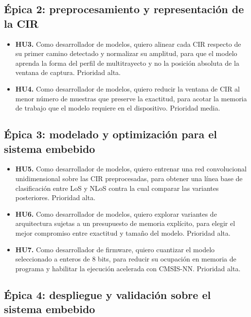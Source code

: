 \documentclass[
11pt, %
]{charter}
\begin{document}
\subsection{Épica 2: preprocesamiento y representación de la CIR}

\begin{itemize}
    \item \textbf{HU3.} Como desarrollador de modelos, quiero alinear cada CIR respecto de su primer camino detectado y normalizar su amplitud, para que el modelo aprenda la forma del perfil de multitrayecto y no la posición absoluta de la ventana de captura. Prioridad alta.
    \item \textbf{HU4.} Como desarrollador de modelos, quiero reducir la ventana de CIR al menor número de muestras que preserve la exactitud, para acotar la memoria de trabajo que el modelo requiere en el dispositivo. Prioridad media.
\end{itemize}

\subsection{Épica 3: modelado y optimización para el sistema embebido}

\begin{itemize}
    \item \textbf{HU5.} Como desarrollador de modelos, quiero entrenar una red convolucional unidimensional sobre las CIR preprocesadas, para obtener una línea base de clasificación entre LoS y NLoS contra la cual comparar las variantes posteriores. Prioridad alta.
    \item \textbf{HU6.} Como desarrollador de modelos, quiero explorar variantes de arquitectura sujetas a un presupuesto de memoria explícito, para elegir el mejor compromiso entre exactitud y tamaño del modelo. Prioridad alta.
    \item \textbf{HU7.} Como desarrollador de firmware, quiero cuantizar el modelo seleccionado a enteros de 8 bits, para reducir su ocupación en memoria de programa y habilitar la ejecución acelerada con CMSIS-NN. Prioridad alta.
\end{itemize}

\subsection{Épica 4: despliegue y validación sobre el sistema embebido}
\end{document}
